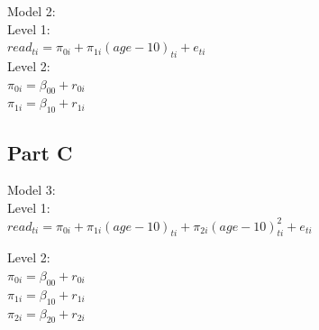 \documentclass[]{article}
\newenvironment{Shaded}{\begin{snugshade}}{\end{snugshade}}
\newcommand{\KeywordTok}[1]{\textcolor[rgb]{0.13,0.29,0.53}{\textbf{#1}}}
\newcommand{\DataTypeTok}[1]{\textcolor[rgb]{0.13,0.29,0.53}{#1}}
\newcommand{\DecValTok}[1]{\textcolor[rgb]{0.00,0.00,0.81}{#1}}
\newcommand{\StringTok}[1]{\textcolor[rgb]{0.31,0.60,0.02}{#1}}
\newcommand{\OperatorTok}[1]{\textcolor[rgb]{0.81,0.36,0.00}{\textbf{#1}}}
\newcommand{\NormalTok}[1]{#1}
\begin{document}
Model 2:\\
Level 1:\\
\(read_{ti} = \pi_{0i} + \pi_{1i}(age-10)_{ti} + e_{ti}\)\\
Level 2:\\
\(\pi_{0i} = \beta_{00} + r_{0i}\)\\
\(\pi_{1i} = \beta_{10} + r_{1i}\)

\begin{Shaded}
\end{Shaded}

\subsection{Part C}\label{part-c}

Model 3:\\
Level 1:\\
\(read_{ti} = \pi_{0i} + \pi_{1i}(age-10)_{ti} + \pi_{2i}(age-10)^2_{ti} + e_{ti}\)

Level 2:\\
\(\pi_{0i} = \beta_{00} + r_{0i}\)\\
\(\pi_{1i} = \beta_{10} + r_{1i}\)\\
\(\pi_{2i} = \beta_{20} + r_{2i}\)

\begin{Shaded}
\end{Shaded}
\end{document}
